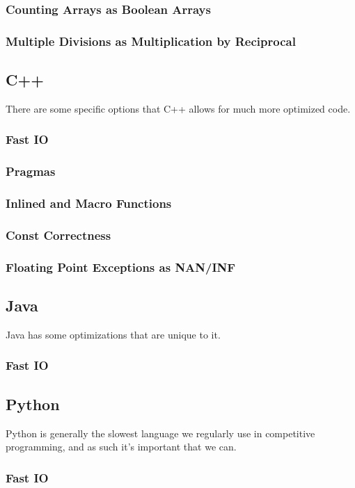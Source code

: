 \subsubsection{Counting Arrays as Boolean Arrays}

\subsubsection{Multiple Divisions as Multiplication by Reciprocal}

\subsection{C++}

There are some specific options that C++ allows for much more optimized code.

\subsubsection{Fast IO}

\subsubsection{Pragmas}

\subsubsection{Inlined and Macro Functions}

\subsubsection{Const Correctness}

\subsubsection{Floating Point Exceptions as NAN/INF}

\subsection{Java}

Java has some optimizations that are unique to it.

\subsubsection{Fast IO}

\subsection{Python}

Python is generally the slowest language we regularly use in competitive programming, and as such it's important that we can. 

\subsubsection{Fast IO}
